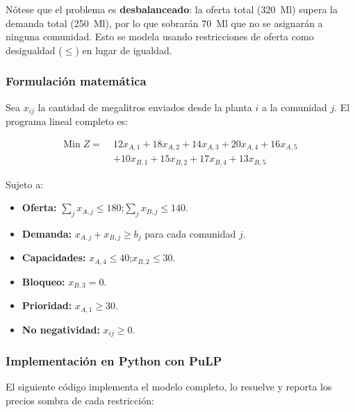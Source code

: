 \documentclass[10pt,letterpaper,twocolumn]{article}
\begin{document}
Nótese que el problema es \textbf{desbalanceado}: la oferta total (320~Ml) supera la demanda total (250~Ml), por lo que sobrarán 70~Ml que no se asignarán a ninguna comunidad. Esto se modela usando restricciones de oferta como desigualdad ($\leq$) en lugar de igualdad.

\subsubsection{Formulación matemática}
Sea $x_{ij}$ la cantidad de megalitros enviados desde la planta $i$ a la comunidad $j$. El programa lineal completo es:

\begin{equation*}
\begin{aligned}
\text{Min}\; Z =\;& 12 x_{A,1} + 18 x_{A,2} + 14 x_{A,3} + 20 x_{A,4} + 16 x_{A,5}\\
                  & + 10 x_{B,1} + 15 x_{B,2} + 17 x_{B,4} + 13 x_{B,5}
\end{aligned}
\end{equation*}

Sujeto a:
\begin{itemize}
\item \textbf{Oferta:} $\sum_j x_{A,j} \leq 180$;\quad $\sum_j x_{B,j} \leq 140$.
\item \textbf{Demanda:} $x_{A,j} + x_{B,j} \geq b_j$ para cada comunidad $j$.
\item \textbf{Capacidades:} $x_{A,4} \leq 40$;\quad $x_{B,2} \leq 30$.
\item \textbf{Bloqueo:} $x_{B,3} = 0$.
\item \textbf{Prioridad:} $x_{A,1} \geq 30$.
\item \textbf{No negatividad:} $x_{ij} \geq 0$.
\end{itemize}

\subsubsection{Implementación en Python con PuLP}
El siguiente código implementa el modelo completo, lo resuelve y reporta los precios sombra de cada restricción:
\end{document}

